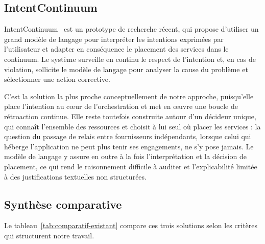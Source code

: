 \subsection{IntentContinuum}
\label{sec:etat-art-intentcontinuum}

IntentContinuum~\cite{akbari2025intentcontinuum} est un prototype de recherche récent, qui propose d'utiliser un grand modèle de langage pour interpréter les intentions exprimées par l'utilisateur et adapter en conséquence le placement des services dans le continuum. Le système surveille en continu le respect de l'intention et, en cas de violation, sollicite le modèle de langage pour analyser la cause du problème et sélectionner une action corrective.

C'est la solution la plus proche conceptuellement de notre approche, puisqu'elle place l'intention au cœur de l'orchestration et met en œuvre une boucle de rétroaction continue. Elle reste toutefois construite autour d'un décideur unique, qui connaît l'ensemble des ressources et choisit à lui seul où placer les services : la question du passage de relais entre fournisseurs indépendants, lorsque celui qui héberge l'application ne peut plus tenir ses engagements, ne s'y pose jamais. Le modèle de langage y assure en outre à la fois l'interprétation et la décision de placement, ce qui rend le raisonnement difficile à auditer et l'explicabilité limitée à des justifications textuelles non structurées.

\subsection{Synthèse comparative}
\label{sec:etat-art-synthese}

Le tableau~\ref{tab:comparatif-existant} compare ces trois solutions selon les critères qui structurent notre travail.

